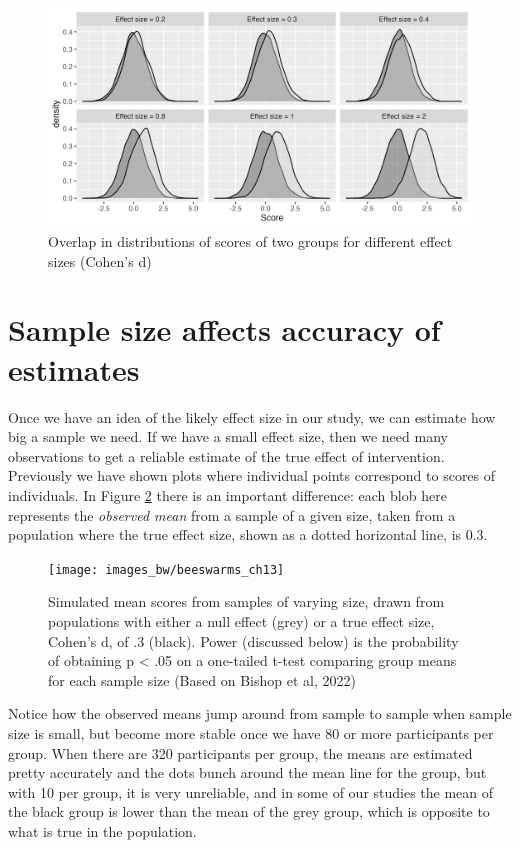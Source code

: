 \documentclass{krantz}
\begin{document}
\begin{figure}
\includegraphics[width=1\linewidth]{images_bw/densityplot} \caption{Overlap in distributions of scores of two groups for different effect sizes (Cohen's d)}\label{fig:effsizefig}
\end{figure}

\hypertarget{sample-size-affects-accuracy-of-estimates}{%
\section{Sample size affects accuracy of estimates}\label{sample-size-affects-accuracy-of-estimates}}

Once we have an idea of the likely effect size in our study, we can estimate how big a sample we need. If we have a small effect size, then we need many observations to get a reliable estimate of the true effect of intervention. Previously we have shown plots where individual points correspond to scores of individuals. In Figure \ref{fig:varES} there is an important difference: each blob here represents the \emph{observed mean} from a sample of a given size, taken from a population where the true effect size, shown as a dotted horizontal line, is 0.3.

\begin{figure}
\texttt{[image: images\_bw/beeswarms\_ch13]} \caption{Simulated mean scores from samples of varying size, drawn from populations with either a null effect (grey) or a true effect size, Cohen's d, of .3 (black). Power (discussed below) is the probability of obtaining p < .05 on a one-tailed t-test comparing group means for each sample size (Based on Bishop et al, 2022)}\label{fig:varES}
\end{figure}

Notice how the observed means jump around from sample to sample when sample size is small, but become more stable once we have 80 or more participants per group. When there are 320 participants per group, the means are estimated pretty accurately and the dots bunch around the mean line for the group, but with 10 per group, it is very unreliable, and in some of our studies the mean of the black group is lower than the mean of the grey group, which is opposite to what is true in the population.
\end{document}

